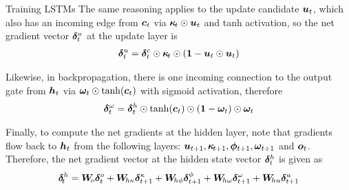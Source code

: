 \begin{frame}{Training LSTMs}
The same reasoning applies to the update candidate ${\boldsymbol u}_t$, which also has an
incoming edge from ${\boldsymbol c}_t$ via ${\bm \kappa}_{\!t} \odot {\boldsymbol u}_t$ and tanh
activation, so the net gradient vector ${\bm \delta}_t^u$ at the update layer
is
\begin{align*}
    {\bm \delta}_t^u = {\bm \delta}_t^c \odot {\bm \kappa}_{\!t} \odot (\mathbf{1} - {\boldsymbol u}_t \odot
    {\boldsymbol u}_t)
\end{align*}

Likewise, in backpropagation, there is one incoming connection to the
output gate from ${\boldsymbol h}_t$ via ${\bm \omega}_t \odot \tanh({\boldsymbol c}_t)$ with
sigmoid activation, therefore
\begin{align*}
    {\bm \delta}_t^\omega = {\bm \delta}_t^h \odot \tanh({\boldsymbol c}_t) \odot (\mathbf{1} - {\bm \omega}_t) \odot {\bm \omega}_t
\end{align*}

Finally, to compute the net gradients at the hidden layer, note that 
gradients flow back to ${\boldsymbol h}_{t}$ from the
following layers: ${\boldsymbol u}_{t+1}, {\bm \kappa}_{\!t+1}, {\bm \phi}_{t+1},
{\bm \omega}_{t+1}$ and ${\boldsymbol o}_t$. Therefore, 
the net gradient vector at the hidden state vector ${\bm \delta}_t^h$ is given as
    \begin{align*}
        {\bm \delta}_{\!t}^h = {\boldsymbol W}_{\!o} {\bm \delta}_t^o 
        + {\boldsymbol W}_{\!h\kappa} {\bm \delta}_{t+1}^\kappa
        + {\boldsymbol W}_{\!h\phi} {\bm \delta}_{t+1}^\phi
        + {\boldsymbol W}_{\!h\omega} {\bm \delta}_{t+1}^\omega
        + {\boldsymbol W}_{\!hu} {\bm \delta}_{t+1}^u
    \end{align*}
\end{frame}

